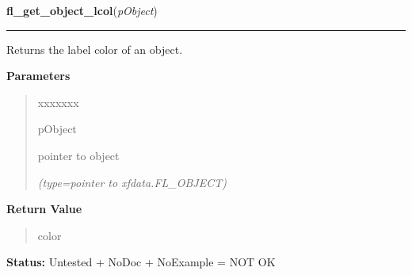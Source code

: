\hspace{.8\funcindent}\begin{boxedminipage}{\funcwidth}

    \raggedright \textbf{fl\_get\_object\_lcol}(\textit{pObject})

    \vspace{-1.5ex}

    \rule{\textwidth}{0.5\fboxrule}
\setlength{\parskip}{2ex}
    Returns the label color of an object.

\setlength{\parskip}{1ex}
      \textbf{Parameters}
      \vspace{-1ex}

      \begin{quote}
        \begin{Ventry}{xxxxxxx}

          \item[pObject]

          pointer to object

            {\it (type=pointer to xfdata.FL\_OBJECT)}

        \end{Ventry}

      \end{quote}

      \textbf{Return Value}
    \vspace{-1ex}

      \begin{quote}
      color

      \end{quote}

\textbf{Status:} Untested + NoDoc + NoExample = NOT OK



    \end{boxedminipage}

    \label{xformslib:library:fl_set_object_return}

    \vspace{0.5ex}

